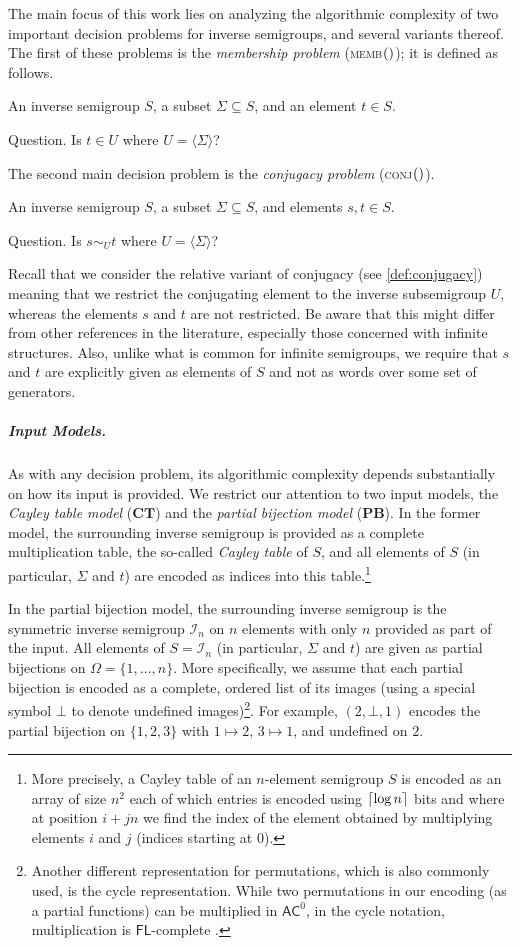 \documentclass[anonymous,letter,UKenglish,cleveref,autoref,thm-restate]{lipics-v2021}
\makeatletter
\newcommand{\sse}{\subseteq}
\newcommand{\ceil}[1] {\ensuremath\left\lceil#1\right\rceil}
\newcommand{\gen}[1]{\langle #1 \rangle}
\newcommand{\ACz}{\ensuremath{\mathsf{AC}^0}\xspace}
\newcommand{\ISym}{\cI}
\newcommand{\cI}{\mathcal{I}}
\theoremstyle{plain}
\theoremstyle{plain}
\providecommand\iitem{}
\providecommand\qitem{}
\newcommand\decproblem@iitem@label{\rlap{Input.}\phantom{Question.}}
\newcommand\decproblem@qitem@label{Question.}
\newenvironment{decproblem}{\begin{description}\begin{samepage}\renewcommand{\iitem}{\item[\decproblem@iitem@label]}\renewcommand{\qitem}{\item[\decproblem@qitem@label]}}{\end{samepage}\end{description}}
\newcommand{\dMemb}[2][]{\textup{\textsc{memb${}_{\mathbf{#1}}\expandafter\ifx\expandafter\relax\detokenize{#2}\relax\else(#2)\fi$}}}
\newcommand{\dConj}[2][]{\textup{\textsc{conj${}_{\mathbf{#1}}\expandafter\ifx\expandafter\relax\detokenize{#2}\relax\else(#2)\fi$}}}
\newcommand{\mysubparagraph}[1]{\vspace*{-2mm}\subparagraph*{#1}}
\makeatother
\begin{document}
The main focus of this work lies on analyzing the algorithmic complexity of two important decision problems for inverse semigroups, and several variants thereof.
The first of these problems is the \emph{membership problem} (\dMemb{}); it is defined as follows.

\begin{decproblem}
  \iitem An inverse semigroup $S$, a subset $\Sigma \sse S$, and an element $t \in S$.
  \qitem Is $t \in U$ where $U = \gen{\Sigma}$?
\end{decproblem}

\noindent
The second main decision problem is the \emph{conjugacy problem} (\dConj{}).

\begin{decproblem}
	\iitem An inverse semigroup $S$, a subset $\Sigma \sse S$, and elements $s,t \in S$.
	\qitem Is $s \sim_U t$ where $U = \gen{\Sigma}$?
\end{decproblem}

Recall that we consider the relative variant of conjugacy (see \cref{def:conjugacy}) meaning that we restrict the conjugating element to the inverse subsemigroup $U$, whereas the elements $s$ and $t$ are not restricted. 
Be aware that this might differ from other references in the literature, especially those concerned with infinite structures. 
Also, unlike what is common for infinite semigroups, we require that $s$ and $t$ are explicitly given as elements of $S$ and not as words over some set of generators.


\mysubparagraph{Input Models.}
As with any decision problem, its algorithmic complexity depends substantially on how its input is provided.
We restrict our attention to two input models, the \emph{Cayley table model} ($\mathbf{CT}$) and the \emph{partial bijection model} ($\mathbf{PB}$).
In the former model, the surrounding inverse semigroup is provided as a complete multiplication table, the so-called \emph{Cayley table} of $S$, and all elements of $S$ (in particular, $\Sigma$ and $t$) are encoded as indices into this table.\footnote{More precisely, a Cayley table of an $n$-element semigroup $S$ is encoded as an array of size $n^2$ each of which entries is encoded using $\ceil{\log n}$ bits and where at position $i + jn$ we find the index of the element obtained by multiplying elements $i$ and $j$ (indices starting at $0$).}

In the partial bijection model, the surrounding inverse semigroup is the symmetric inverse semigroup $\ISym_n$ on $n$ elements with only $n$ provided as part of the input.
All elements of $S = \ISym_n$ (in particular, $\Sigma$ and $t$) are given as partial bijections on $\Omega = \{ 1, \dotsc, n\}$.
More specifically, we assume that each partial bijection is encoded as a complete, ordered list of its images (using a special symbol $\bot$ to denote undefined images)\footnote{Another different representation for permutations, which is also commonly used, is the cycle representation. While two permutations in our encoding (as a partial functions) can be multiplied in \ACz, in the cycle notation, multiplication is $\mathsf{FL}$-complete \cite{CookM87}.}.
For example, $(2,\bot,1)$ encodes the partial bijection on $\{1,2,3\}$ with $1 \mapsto 2$, $3 \mapsto 1$, and undefined on $2$.
\end{document}
